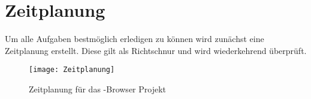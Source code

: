 \author{Gottfried von Recum}
\section{Zeitplanung}

Um alle Aufgaben bestmöglich erledigen zu können wird zunächst eine Zeitplanung erstellt. Diese gilt als Richtschnur und wird wiederkehrend überprüft.

\begin{figure}[ht]
    \centering
    \texttt{[image: Zeitplanung]}
    \caption{Zeitplanung für das \SECH-Browser Projekt}
    \label{fig:Zeitplanung}
\end{figure}